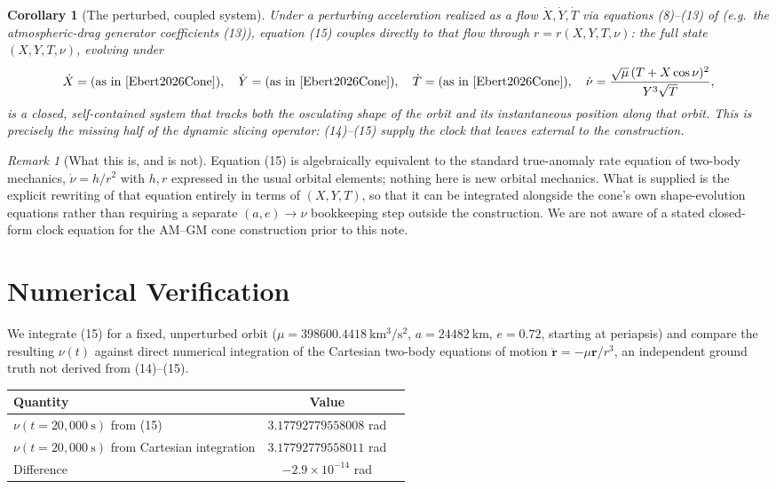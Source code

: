 \documentclass[12pt]{amsart}
\theoremstyle{plain}
\newtheorem{corollary}[theorem]{Corollary}
\theoremstyle{remark}
\newtheorem*{remark}{Remark}
\begin{document}
\begin{corollary}[The perturbed, coupled system]
Under a perturbing acceleration realized as a flow $\dot X, \dot Y, \dot T$ via equations (8)--(13) of \cite{Ebert2026Cone} (e.g.\ the atmospheric-drag generator coefficients (13)), equation (15) couples directly to that flow through $r=r(X,Y,T,\nu)$: the full state $(X,Y,T,\nu)$, evolving under
\[
\dot X = \text{(as in \cite{Ebert2026Cone})},\quad
\dot Y = \text{(as in \cite{Ebert2026Cone})},\quad
\dot T = \text{(as in \cite{Ebert2026Cone})},\quad
\dot\nu = \frac{\sqrt{\mu}\,(T+X\cos\nu)^2}{Y^3\sqrt T},
\]
is a closed, self-contained system that tracks both the osculating shape of the orbit and its instantaneous position along that orbit. This is precisely the missing half of the dynamic slicing operator: (14)--(15) supply the clock that \cite{Ebert2026Cone} leaves external to the construction.
\end{corollary}

\begin{remark}[What this is, and is not]
Equation (15) is algebraically equivalent to the standard true-anomaly rate equation of two-body mechanics, $\dot\nu=h/r^2$ with $h,r$ expressed in the usual orbital elements; nothing here is new orbital mechanics. What is supplied is the explicit rewriting of that equation entirely in terms of $(X,Y,T)$, so that it can be integrated alongside the cone's own shape-evolution equations rather than requiring a separate $(a,e)\to\nu$ bookkeeping step outside the construction. We are not aware of a stated closed-form clock equation for the AM--GM cone construction prior to this note.
\end{remark}

\section{Numerical Verification}

We integrate (15) for a fixed, unperturbed orbit ($\mu=398600.4418\ \mathrm{km^3/s^2}$, $a=24482\ \mathrm{km}$, $e=0.72$, starting at periapsis) and compare the resulting $\nu(t)$ against direct numerical integration of the Cartesian two-body equations of motion $\ddot{\mathbf r}=-\mu\mathbf r/r^3$, an independent ground truth not derived from (14)--(15).

\begin{center}
\begin{tabular}{lcc}
\hline
Quantity & Value \\
\hline
$\nu(t{=}20{,}000\ \mathrm{s})$ from (15) & $3.17792779558008$ rad \\
$\nu(t{=}20{,}000\ \mathrm{s})$ from Cartesian integration & $3.17792779558011$ rad \\
Difference & $-2.9\times10^{-14}$ rad \\
\hline
\end{tabular}
\end{center}
\end{document}
